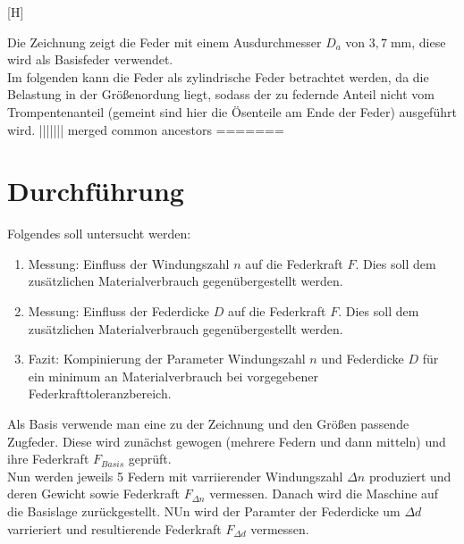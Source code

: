 \begin{center}[H]
\end{center}
Die Zeichnung zeigt die Feder mit einem Ausdurchmesser $D_a$ von $3,7\;\text{mm}$, diese wird
als Basisfeder verwendet.\\ 

Im folgenden kann die Feder als zylindrische Feder betrachtet werden,
da die Belastung in der Größenordung liegt, sodass der zu federnde Anteil nicht 
vom Trompentenanteil (gemeint sind hier die Ösenteile am Ende der Feder)
ausgeführt wird.
||||||| merged common ancestors
=======
\newpage
\section{Durchführung}
Folgendes soll untersucht werden:
\begin{enumerate}
    \item Messung: Einfluss der Windungszahl $n$ auf die Federkraft $F$. Dies soll dem zusätzlichen
    Materialverbrauch gegenübergestellt werden.
    \item Messung: Einfluss der Federdicke $D$ auf die Federkraft $F$. Dies soll dem zusätzlichen
    Materialverbrauch gegenübergestellt werden.
    \item Fazit: Kompinierung der Parameter Windungszahl $n$ und Federdicke $D$ für ein minimum
    an Materialverbrauch bei vorgegebener Federkrafttoleranzbereich.
\end{enumerate}
Als Basis verwende man eine zu der Zeichnung und den Größen passende Zugfeder. Diese
wird zunächst gewogen (mehrere Federn und dann mitteln) und ihre Federkraft $F_{Basis}$
geprüft.\\
Nun werden jeweils 5 Federn mit varriierender Windungszahl $\Delta n$ produziert und deren
Gewicht sowie Federkraft $F_{\Delta n}$ vermessen.
Danach wird die Maschine auf die Basislage zurückgestellt. NUn wird der Paramter 
der Federdicke um $\Delta d$ varrieriert und resultierende Federkraft $F_{\Delta d}$
vermessen.  

